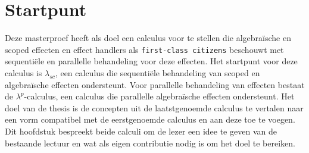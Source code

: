 \chapter{Startpunt}\label{hoofdstuk:startpunt}
Deze masterproef heeft als doel een calculus voor te stellen die algebraïsche en scoped effecten en effect handlers als \texttt{first-class citizens} beschouwt met sequentiële en parallelle behandeling voor deze effecten. Het startpunt voor deze calculus is $\lambda_{sc}$\cite{Bosman2022}, een calculus die sequentiële behandeling van scoped en algebraïsche effecten ondersteunt. Voor parallelle behandeling van effecten bestaat de $\lambda^{p}$-calculus\cite{Xie2021}, een calculus die parallelle algebraïsche effecten ondersteunt. Het doel van de thesis is de concepten uit de laatstgenoemde calculus te vertalen naar een vorm compatibel met de eerstgenoemde calculus en aan deze toe te voegen. Dit hoofdstuk bespreekt beide calculi om de lezer een idee te geven van de bestaande lectuur en wat als eigen contributie nodig is om het doel te bereiken.

